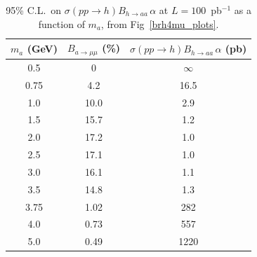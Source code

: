 \documentclass[aps,12pt,superscriptaddress,nofootinbib,floatfix,showpacs]{revtex4}
\begin{document}
\begin{table}[htb]
\caption{95\% C.L.\ on $\sigma(pp \to h) B_{h \to aa} \, \alpha$ at $L = 100$~pb$^{-1}$ as a function of $m_a$, from Fig~\ref{brh4mu_plots}. \label{table_bramumu_factorized}}
\begin{center}
\renewcommand{\arraystretch}{1.1}
\begin{tabular}{| c | c | c |}
\hline
\mbox{\hspace{0.25 cm}}$m_a$ (GeV)\mbox{\hspace{0.25 cm}} & \mbox{\hspace{0.25 cm}}$B_{a \to \mu\mu}$ (\%)\mbox{\hspace{0.25 cm}} & \mbox{\hspace{0.25 cm}}$\sigma(pp \to h) B_{h \to aa} \, \alpha$ (pb)\mbox{\hspace{0.25 cm}} \\\hline
0.5 & 0 & $\infty$ \\
0.75 & 4.2 & 16.5 \\
1.0 & 10.0 & 2.9 \\
1.5 & 15.7 & 1.2 \\
2.0 & 17.2 & 1.0 \\
2.5 & 17.1 & 1.0 \\
3.0 & 16.1 & 1.1 \\
3.5 & 14.8 & 1.3 \\
3.75 & 1.02 & 282 \\
4.0 & 0.73 & 557 \\
5.0 & 0.49 & 1220 \\\hline
\end{tabular}
\end{center}
\end{table}
\end{document}
